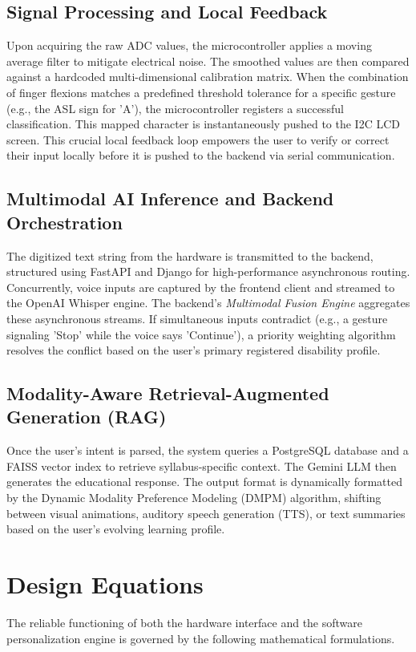 \subsection{Signal Processing and Local Feedback}
Upon acquiring the raw ADC values, the microcontroller applies a moving average filter to mitigate electrical noise. The smoothed values are then compared against a hardcoded multi-dimensional calibration matrix. When the combination of finger flexions matches a predefined threshold tolerance for a specific gesture (e.g., the ASL sign for 'A'), the microcontroller registers a successful classification. This mapped character is instantaneously pushed to the I2C LCD screen. This crucial local feedback loop empowers the user to verify or correct their input locally before it is pushed to the backend via serial communication.

\subsection{Multimodal AI Inference and Backend Orchestration}
The digitized text string from the hardware is transmitted to the backend, structured using FastAPI and Django for high-performance asynchronous routing. Concurrently, voice inputs are captured by the frontend client and streamed to the OpenAI Whisper engine. The backend's \textit{Multimodal Fusion Engine} aggregates these asynchronous streams. If simultaneous inputs contradict (e.g., a gesture signaling 'Stop' while the voice says 'Continue'), a priority weighting algorithm resolves the conflict based on the user's primary registered disability profile. 

\subsection{Modality-Aware Retrieval-Augmented Generation (RAG)}
Once the user's intent is parsed, the system queries a PostgreSQL database and a FAISS vector index to retrieve syllabus-specific context. The Gemini LLM then generates the educational response. The output format is dynamically formatted by the Dynamic Modality Preference Modeling (DMPM) algorithm, shifting between visual animations, auditory speech generation (TTS), or text summaries based on the user's evolving learning profile.

\section{Design Equations}
\label{sec:design_equations}
The reliable functioning of both the hardware interface and the software personalization engine is governed by the following mathematical formulations.

